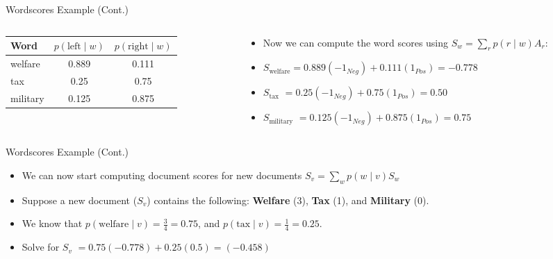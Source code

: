 \documentclass[
  ignorenonframetext,
  aspectratio=169]{beamer}
\begin{document}
\begin{frame}{Wordscores Example (Cont.)}
\label{wordscores-example-cont.-1}
\begin{columns}[T]
    \footnotesize
    \begin{column}{0.4\textwidth}
    \centering
    \begin{tabular}{lcc}
    \toprule
    Word & $p(\text{left}\mid w)$ & $p(\text{right}\mid w)$ \\
    \midrule
    welfare & 0.889 & 0.111 \\
    tax & 0.25 & 0.75 \\
    military & 0.125 & 0.875 \\
    \bottomrule
    \end{tabular}
    \end{column}
    \begin{column}{0.6\textwidth}
    \normalsize
    \begin{itemize}
        \item Now we can compute the word scores using 
        $S_{w} = \sum_{r}p(r\mid w)A_{r}$: \par \vspace{5mm}
        \item[] $S_{\text{welfare}} = 0.889(-1_{Neg}) + 0.111(1_{Pos}) = -0.778$ \par \vspace{2.5mm}
        \item[] $S_{\text{tax}}$ \pause $= 0.25(-1_{Neg}) + 0.75(1_{Pos}) = 0.50$ \par \vspace{2.5mm}
        \item[] $S_{\text{military}}$ \pause $= 0.125(-1_{Neg}) + 0.875(1_{Pos}) = 0.75$ 
    \end{itemize}
    \end{column}
\end{columns}
\end{frame}

\begin{frame}{Wordscores Example (Cont.)}
\label{wordscores-example-cont.-2}
\begin{itemize}
\item We can now start computing document scores for new documents $S_{v} = \sum_{w}p(w\mid v)S_{w}$ \par \vspace{2.5mm}
\item  Suppose a new document ($S_{v}$) contains the following: \textbf{Welfare} (3), \textbf{Tax} (1), and  \textbf{Military} (0).\par \vspace{2.5mm} 
\item We know that $p(\text{welfare}\mid v) = \frac{3}{4} = 0.75$, and $p(\text{tax}\mid v) = \frac{1}{4} = 0.25$. \par \vspace{2.5mm}
\item Solve for $S_{v}$ \pause $ = 0.75(-0.778) + 0.25(0.5) = (-0.458)$
\end{itemize}
\end{frame}
\end{document}
